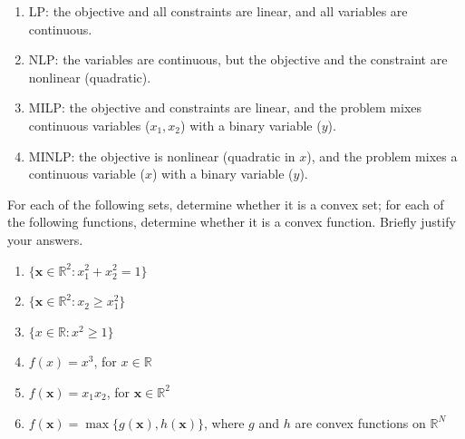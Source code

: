 \begin{solution}
    
    \begin{enumerate}[label=(\alph*)]
        \item LP: the objective and all constraints are linear, and all variables are continuous.
        \item NLP: the variables are continuous, but the objective and the constraint are nonlinear (quadratic).
        \item MILP: the objective and constraints are linear, and the problem mixes continuous variables ($x_1, x_2$) with a binary variable ($y$).
        \item MINLP: the objective is nonlinear (quadratic in $x$), and the problem mixes a continuous variable ($x$) with a binary variable ($y$).
    \end{enumerate}
    
\end{solution}

\begin{exercise} %
    
    For each of the following sets, determine whether it is a convex set; for each of the following functions, determine whether it is a convex function. Briefly justify your answers.
    \begin{enumerate}[label=(\alph*)]
        \item $\{\mathbf{x} \in \mathbb{R}^2 : x_1^2 + x_2^2 = 1\}$
        \item $\{\mathbf{x} \in \mathbb{R}^2 : x_2 \ge x_1^2\}$
        \item $\{x \in \mathbb{R} : x^2 \ge 1\}$
        \item $f(x) = x^3$, for $x \in \mathbb{R}$
        \item $f(\mathbf{x}) = x_1 x_2$, for $\mathbf{x} \in \mathbb{R}^2$
        \item $f(\mathbf{x}) = \max\{g(\mathbf{x}), h(\mathbf{x})\}$, where $g$ and $h$ are convex functions on $\mathbb{R}^N$
    \end{enumerate}
    
\end{exercise}

